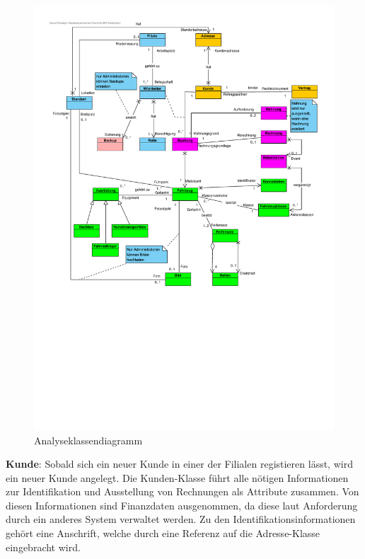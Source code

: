 \begin{figure}[!ht]
    \centering
    \includegraphics[width=\textwidth, trim = 0cm 9cm 0cm 0cm]{Bilder/Diagramme/Analyseklassendiagramm_v2.pdf}
    \caption{Analyseklassendiagramm}
    \label{img:akd}
\end{figure}

\newpage

\textbf{Kunde}: Sobald sich ein neuer Kunde in einer der Filialen registieren lässt, wird ein neuer Kunde angelegt. Die Kunden-Klasse führt alle nötigen Informationen zur Identifikation und Ausstellung von Rechnungen als Attribute zusammen. Von diesen Informationen sind Finanzdaten ausgenommen, da diese laut Anforderung durch ein anderes System verwaltet werden. Zu den Identifikationsinformationen gehört eine Anschrift, welche durch eine Referenz auf die Adresse-Klasse eingebracht wird. 

